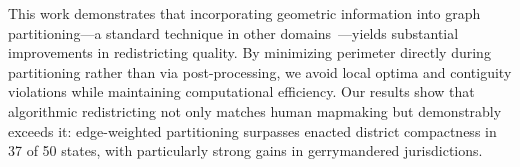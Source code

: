 This work demonstrates that incorporating geometric information into graph partitioning—a standard technique in other domains~\cite{hendrickson1995graph}—yields substantial improvements in redistricting quality. By minimizing perimeter directly during partitioning rather than via post-processing, we avoid local optima and contiguity violations while maintaining computational efficiency. Our results show that algorithmic redistricting not only matches human mapmaking but demonstrably exceeds it: edge-weighted partitioning surpasses enacted district compactness in 37 of 50 states, with particularly strong gains in gerrymandered jurisdictions.
